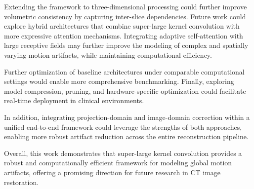 Extending the framework to three-dimensional processing could further improve volumetric consistency by capturing inter-slice dependencies. Future work could explore hybrid architectures that combine super-large kernel convolution with more expressive attention mechanisms. Integrating adaptive self-attention with large receptive fields may further improve the modeling of complex and spatially varying motion artifacts, while maintaining computational efficiency.

Further optimization of baseline architectures under comparable computational settings would enable more comprehensive benchmarking. Finally, exploring model compression, pruning, and hardware-specific optimization could facilitate real-time deployment in clinical environments.

In addition, integrating projection-domain and image-domain correction within a unified end-to-end framework could leverage the strengths of both approaches, enabling more robust artifact reduction across the entire reconstruction pipeline.


Overall, this work demonstrates that super-large kernel convolution provides a robust and computationally efficient framework for modeling global motion artifacts, offering a promising direction for future research in CT image restoration.


 

 

 


 